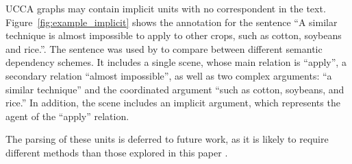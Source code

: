 \documentclass[11pt,a4paper]{article}
\newcommand{\figref}[1]{Figure~\ref{#1}}
\begin{document}
UCCA graphs may contain implicit units with no correspondent in the text.
\figref{fig:example_implicit} shows the annotation for the sentence
``A similar technique is almost impossible to apply to other crops, such as cotton, soybeans and rice.''.
The sentence was used by \citet{oepen2015semeval} to compare between different semantic
dependency schemes.
It includes a single scene, whose main relation is ``apply'', a secondary relation ``almost impossible'', as well as two complex arguments: ``a similar technique'' and the coordinated argument ``such as cotton, soybeans, and rice.''
In addition, the scene includes an implicit argument, which represents the agent of the
``apply'' relation.

The parsing of these units is deferred to future work, as it is likely to require different methods
than those explored in this paper \cite{roth2015inducing}.
\end{document}
